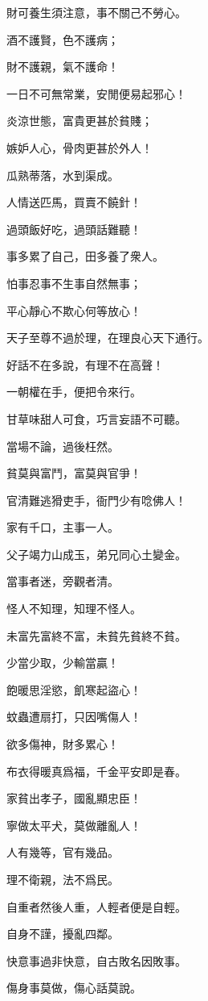 \documentclass[12pt,a4paper]{ctexbook}
\begin{document}
財可養生須注意，事不關己不勞心。\par
酒不護賢，色不護病；\par
財不護親，氣不護命！\par
一日不可無常業，安閒便易起邪心！\par
炎涼世態，富貴更甚於貧賤；\par
嫉妒人心，骨肉更甚於外人！\par
瓜熟蒂落，水到渠成。\par
人情送匹馬，買賣不饒針！\par
過頭飯好吃，過頭話難聽！\par
事多累了自己，田多養了衆人。\par
怕事忍事不生事自然無事；\par
平心靜心不欺心何等放心！\par
天子至尊不過於理，在理良心天下通行。\par
好話不在多說，有理不在高聲！\par
一朝權在手，便把令來行。\par
甘草味甜人可食，巧言妄語不可聽。\par
當場不論，過後枉然。\par
貧莫與富鬥，富莫與官爭！\par
官清難逃猾吏手，衙門少有唸佛人！\par
家有千口，主事一人。\par
父子竭力山成玉，弟兄同心土變金。\par
當事者迷，旁觀者清。\par
怪人不知理，知理不怪人。\par
未富先富終不富，未貧先貧終不貧。\par
少當少取，少輸當贏！\par
飽暖思淫慾，飢寒起盜心！\par
蚊蟲遭扇打，只因嘴傷人！\par
欲多傷神，財多累心！\par
布衣得暖真爲福，千金平安即是春。\par
家貧出孝子，國亂顯忠臣！\par
寧做太平犬，莫做離亂人！\par
人有幾等，官有幾品。\par
理不衛親，法不爲民。\par
自重者然後人重，人輕者便是自輕。\par
自身不謹，擾亂四鄰。\par
快意事過非快意，自古敗名因敗事。\par
傷身事莫做，傷心話莫說。\par
\end{document}

